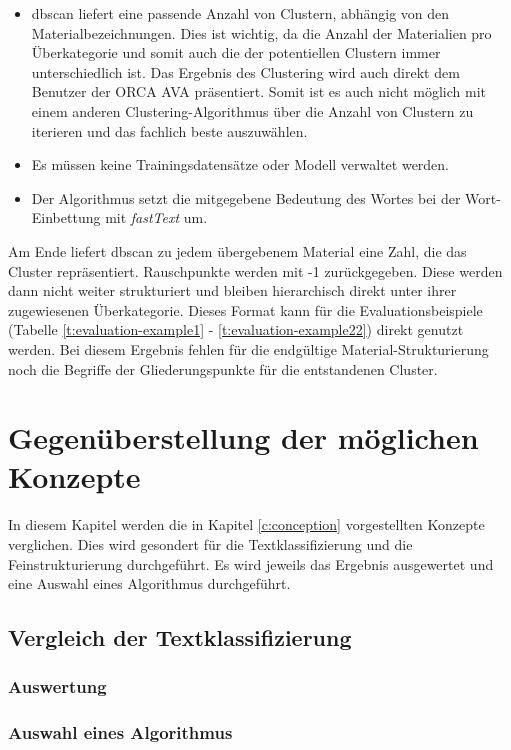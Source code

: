 \begin{itemize}
	\item \ac{dbscan} liefert eine passende Anzahl von Clustern, abhängig von den Materialbezeichnungen. Dies ist wichtig, da die Anzahl der Materialien pro Überkategorie und somit auch die der potentiellen Clustern immer unterschiedlich ist. Das Ergebnis des Clustering wird auch direkt dem Benutzer der ORCA AVA präsentiert. Somit ist es auch nicht möglich mit einem anderen Clustering-Algorithmus über die Anzahl von Clustern zu iterieren und das fachlich beste auszuwählen.
	\item Es müssen keine Trainingsdatensätze oder Modell verwaltet werden.
	\item Der Algorithmus setzt die mitgegebene Bedeutung des Wortes bei der Wort-Einbettung mit \textit{fastText} um. 
\end{itemize}

Am Ende liefert \ac{dbscan} zu jedem übergebenem Material eine Zahl, die das Cluster repräsentiert. Rauschpunkte werden mit -1 zurückgegeben. Diese werden dann nicht weiter strukturiert und bleiben hierarchisch direkt unter ihrer zugewiesenen Überkategorie. Dieses Format kann für die Evaluationsbeispiele (Tabelle \ref{t:evaluation-example1} - \ref{t:evaluation-example22}) direkt genutzt werden. Bei diesem Ergebnis fehlen für die endgültige Material-Strukturierung noch die Begriffe der Gliederungspunkte für die entstandenen Cluster.

\chapter{Gegenüberstellung der möglichen Konzepte}
\label{c:comparison}
In diesem Kapitel werden die in Kapitel \ref{c:conception} vorgestellten Konzepte verglichen.
Dies wird gesondert für die Textklassifizierung und die Feinstrukturierung durchgeführt. Es wird jeweils das Ergebnis ausgewertet und eine Auswahl eines Algorithmus durchgeführt.
\section{Vergleich der Textklassifizierung}
\label{c:comparison:classification}
\subsection{Auswertung}
\label{c:comparison:classification:evaluation}
\subsection{Auswahl eines Algorithmus}
\label{c:comparison:classification:selection}
